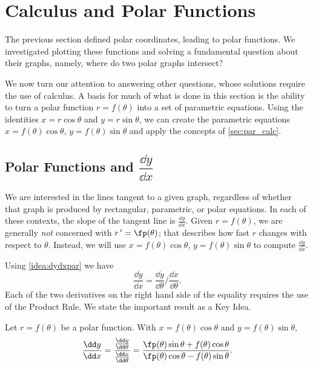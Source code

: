 \section{Calculus and Polar Functions} \label{sec:polarcalc}

The previous section defined polar coordinates, leading to polar functions. We investigated plotting these functions and solving a fundamental question about their graphs, namely, where do two polar graphs intersect?

We now turn our attention to answering other questions, whose solutions require the use of calculus. A basis for much of what is done in this section is the ability to turn a polar function $r=f(\theta)$ into a set of parametric equations. Using the identities $x=r\cos \theta$ and $y=r\sin \theta$, we can create the parametric equations $x=f(\theta)\cos\theta$, $y=f(\theta)\sin\theta$ and apply the concepts of \autoref{sec:par_calc}.

\subsection{Polar Functions and \texorpdfstring{$\dfrac{\dd y}{\dd x}$}{dy/dx}}

We are interested in the lines tangent to a given graph, regardless of whether that graph is produced by rectangular, parametric, or polar equations. In each of these contexts, the slope of the tangent line is $\frac{\dd y}{\dd x}$. Given $r=f(\theta)$, we are generally \emph{not} concerned with $r\,'=\fp(\theta)$; that describes how fast $r$ changes with respect to $\theta$. Instead, we will use $x=f(\theta)\cos\theta$, $y=f(\theta)\sin\theta$ to compute $\frac{\dd y}{\dd x}$. 

Using \autoref{idea:dydxpar} we have
\[\frac{\dd y}{\dd x} = \frac{\dd y}{\dd\theta}\Big/\frac{\dd x}{\dd\theta}.\]
Each of the two derivatives on the right hand side of the equality requires the use of the Product Rule. We state the important result as a Key Idea.

\begin{keyidea}\label{idea:dydxpol}
Let $r=f(\theta)$ be a polar function. With $x=f(\theta)\cos\theta$ and $y=f(\theta)\sin\theta$,
\[
 \frac{\dd y}{\dd x}
 =\frac{\frac{\dd y}{\dd\theta}}{\frac{\dd x}{\dd\theta}}
 =\frac{\fp(\theta)\sin\theta+f(\theta)\cos\theta}{\fp(\theta)\cos\theta-f(\theta)\sin\theta}.
\]
\end{keyidea}


